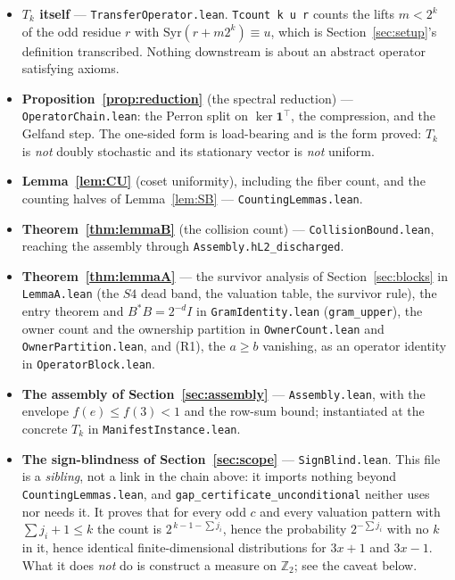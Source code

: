 \documentclass[12pt,a4paper]{article}
\newcommand{\Z}{\mathbb{Z}}
\begin{document}
\begin{itemize}
\item \textbf{$T_k$ itself} --- \texttt{TransferOperator.lean}. \texttt{Tcount k u r} counts the
  lifts $m < 2^k$ of the odd residue $r$ with $\mathrm{Syr}(r + m 2^k) \equiv u$, which is
  Section~\ref{sec:setup}'s definition transcribed. Nothing downstream is about an abstract
  operator satisfying axioms.
\item \textbf{Proposition~\ref{prop:reduction}} (the spectral reduction) ---
  \texttt{OperatorChain.lean}: the Perron split on $\ker \mathbf{1}^\top$, the compression, and
  the Gelfand step. The one-sided form is load-bearing and is the form proved: $T_k$ is
  \emph{not} doubly stochastic and its stationary vector is \emph{not} uniform.
\item \textbf{Lemma~\ref{lem:CU}} (coset uniformity), including the fiber count, and the
  counting halves of Lemma~\ref{lem:SB} --- \texttt{CountingLemmas.lean}.
\item \textbf{Theorem~\ref{thm:lemmaB}} (the collision count) --- \texttt{CollisionBound.lean},
  reaching the assembly through \texttt{Assembly.hL2\_discharged}.
\item \textbf{Theorem~\ref{thm:lemmaA}} --- the survivor analysis of
  Section~\ref{sec:blocks} in \texttt{LemmaA.lean} (the $S4$ dead band, the valuation table, the
  survivor rule), the entry theorem and $B^\ast B = 2^{-d} I$ in \texttt{GramIdentity.lean}
  (\texttt{gram\_upper}), the owner count and the ownership partition in
  \texttt{OwnerCount.lean} and \texttt{OwnerPartition.lean}, and (R1), the $a \ge b$ vanishing,
  as an operator identity in \texttt{OperatorBlock.lean}.
\item \textbf{The assembly of Section~\ref{sec:assembly}} --- \texttt{Assembly.lean}, with the
  envelope $f(e) \le f(3) < 1$ and the row-sum bound; instantiated at the concrete $T_k$ in
  \texttt{ManifestInstance.lean}.
\item \textbf{The sign-blindness of Section~\ref{sec:scope}} --- \texttt{SignBlind.lean}. This
  file is a \emph{sibling}, not a link in the chain above: it imports nothing beyond
  \texttt{CountingLemmas.lean}, and \texttt{gap\_certificate\_unconditional} neither uses nor
  needs it. It proves that for every odd $c$ and every valuation pattern with
  $\sum j_i + 1 \le k$ the count is $2^{\,k-1-\sum j_i}$, hence the probability $2^{-\sum j_i}$
  with no $k$ in it, hence identical finite-dimensional distributions for $3x+1$ and $3x-1$.
  What it does \emph{not} do is construct a measure on $\Z_2$; see the caveat below.
\end{itemize}
\end{document}
